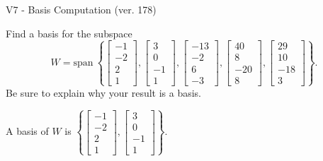 \begin{exercise}
  \begin{exerciseTitle}V7 - Basis Computation (ver. 178)\end{exerciseTitle}
  \begin{exerciseStatement}
    Find a basis for the subspace 
\[W=\mathrm{span}\ \left\{\left[\begin{array}{r}
-1 \\
-2 \\
2 \\
1
\end{array}\right] , \left[\begin{array}{r}
3 \\
0 \\
-1 \\
1
\end{array}\right] , \left[\begin{array}{r}
-13 \\
-2 \\
6 \\
-3
\end{array}\right] , \left[\begin{array}{r}
40 \\
8 \\
-20 \\
8
\end{array}\right] , \left[\begin{array}{r}
29 \\
10 \\
-18 \\
3
\end{array}\right]\right\}.\]
 Be sure to explain why your result is a basis.


  \end{exerciseStatement}
  \begin{exerciseAnswer}
   A basis of \(W\) is  \(\left\{\left[\begin{array}{r}
-1 \\
-2 \\
2 \\
1
\end{array}\right] , \left[\begin{array}{r}
3 \\
0 \\
-1 \\
1
\end{array}\right]\right\}\).
  


  \end{exerciseAnswer}
\end{exercise}